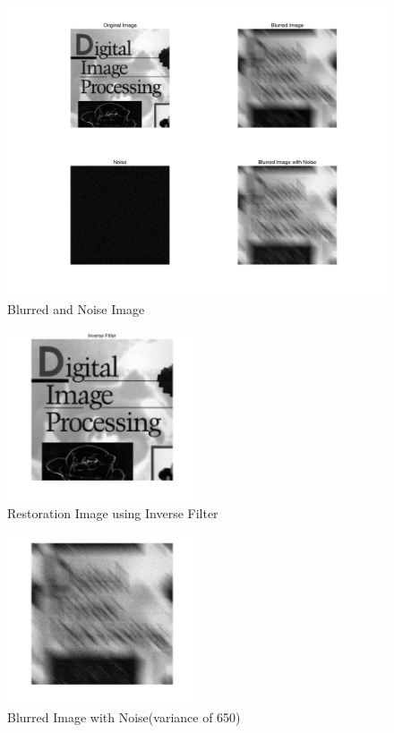 \documentclass[11pt,oneside]{book}
\begin{document}
\begin{figure}[!htb]
   \centering  
   \includegraphics[width=1\textwidth]{images/5/image1.jpg}
   \caption{Blurred and Noise Image}
\end{figure}
\begin{figure}[!htb]
   \centering  
   \includegraphics[width=0.5\textwidth]{images/5/in.jpg}
   \caption{Restoration Image using Inverse Filter}
\end{figure}
\begin{figure}[!htb]
   \centering  
   \includegraphics[width=0.5\textwidth]{images/5/650_.jpg}
   \caption{Blurred Image with Noise(variance of 650)}
\end{figure}
\end{document}
